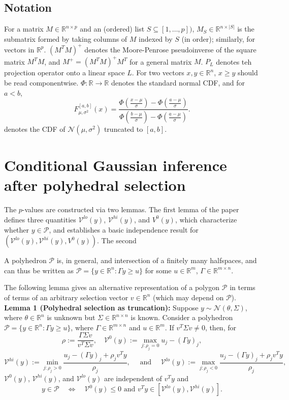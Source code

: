 \documentclass{article}
\newcommand{\R}{\mathbb{R}}                         %
\newcommand{\V}{\mathcal{V}}
\newcommand{\poly}{\mathcal{P}}
\begin{document}
\subsection{Notation}
For a matrix $M \in \R^{n \times p}$ and an (ordered) list
$S \subseteq [1,\dots,p])$, $M_S \in \R^{n \times |S|}$ is the submatrix formed
by taking columns of $M$ indexed by $S$ (in order); similarly, for vectors in
$\R^p$. $(M^TM)^+$ denotes the Moore-Penrose pseudoinverse of the square matrix
$M^TM$, and $M^+ = (M^TM)^+M^T$ for a general matrix $M$. $P_L$ denotes teh
projection operator onto a linear space $L$. For two vectors $x, y \in \R^n$,
$x \geq y$ should be read componentwise. $\Phi : \R \to \R$ denotes the
standard normal CDF, and for $a < b$,
\[F^{[a,b]}_{\mu,\sigma^2}(x)
    = \frac{\Phi\left( \frac{x - \mu}{\sigma} \right)
                                - \Phi\left( \frac{a - \mu}{\sigma} \right)}
        {\Phi\left( \frac{b - \mu}{\sigma} \right)
                                - \Phi\left( \frac{a - \mu}{\sigma} \right)}.
\]
denotes the CDF of $\mathcal{N}(\mu, \sigma^2)$ truncated to $[a,b]$.


\section{Conditional Gaussian inference after polyhedral selection}
The $p$-values are constructed via two lemmas. The first lemma of the paper
defines three quantities $\V^{lo}(y)$, $\V^{hi}(y)$, and $V^0(y)$, which
characterize whether $y \in \poly$, and establishes a basic independence
result for $(\V^{lo}(y),\V^{hi}(y),V^0(y))$. The second

A polyhedron $\poly$ is, in general, and intersection of a finitely many
halfspaces, and can thus be written as
$\poly = \{y \in \R^n : \Gamma y \geq u\}$ for some $u \in \R^m$,
$\Gamma \in \R^{m \times n}$.

The following lemma gives an alternative representation of a polygon $\poly$ in
terms of terms of an arbitrary selection vector $v \in \R^n$ (which may depend
on $\poly$). \\

{\bf Lemma 1 (Polyhedral selection as truncation):}
Suppose $y \sim \mathcal{N}(\theta,\Sigma)$, where $\theta \in \R^n$ is unknown
but $\Sigma \in \R^{n \times n}$ is known. Consider a polyhedron
$\poly = \{y \in \R^n : \Gamma y \geq u \}$, where $\Gamma \in \R^{m \times n}$
and $u \in \R^m$. If $v^T \Sigma v \neq 0$, then, for
\[\rho := \frac{\Gamma \Sigma v}{v^T \Sigma v},
    \quad \V^0(y) := \max_{j : \rho_j = 0} u_j - (\Gamma y)_j,\]
\[\V^{hi}(y) := \min_{j : \rho_j > 0}
    \frac{u_j - (\Gamma y)_j + \rho_j v^T y}{\rho_j},
    \quad \mbox{ and } \quad
\V^{lo}(y) := \max_{j : \rho_j < 0}
    \frac{u_j - (\Gamma y)_j + \rho_j v^T y}{\rho_j},\]
 $\V^0(y)$, $\V^{hi}(y)$, and $\V^{lo}(y)$ are independent of $v^T y$ and
\[y \in \poly
    \quad \Leftrightarrow \quad
    \V^0(y) \leq 0
    \mbox{ and }
    v^T y \in [\V^{lo}(y), \V^{hi}(y)].\]
\end{document}
